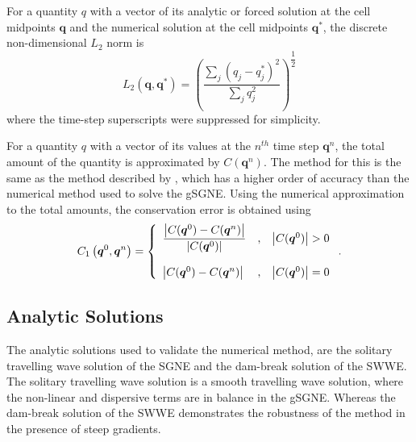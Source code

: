 \documentclass[10pt]{elsarticle}
\newcommand{\vecn}[1]{\boldsymbol{#1}}
\begin{document}
For a quantity $q$ with a vector of its analytic or forced solution at the cell midpoints $\vecn{q}$ and the numerical solution at the cell midpoints $\vecn{q}^*$, the discrete non-dimensional $L_2$ norm is
\begin{equation}
\label{eqn:Conv_Error}
L_2\left(\vecn{q},\vecn{q}^*\right) = \left( \dfrac{\displaystyle\sum_{j}^{}  \left(q_j - q^*_j\right)^2}{\displaystyle\sum_{j}^{}  q_j^2 } \right)^{\dfrac{1}{2}}
\end{equation}
where the time-step superscripts were suppressed for simplicity.

For a quantity $q$ with a vector of its values at the $n^{th}$ time step $\vecn{q}^n$, the total amount of the quantity is approximated by $C(\vecn{q}^n)$. The method for this is the same as the method described by \citet{Zoppou-etal-2017}, which has a higher order of accuracy than the numerical method used to solve the gSGNE. Using the numerical approximation to the total amounts, the conservation error is obtained using
\begin{equation}
\label{eqn:Cons_Error}
C_1\left(\vecn{q}^0,\vecn{q}^n\right) = \left \lbrace \begin{array}{l c r}
\dfrac{\left | C(\vecn{q}^0) - C(\vecn{q}^n) \right |}{\left| C(\vecn{q}^0) \right|} &,& \left| C(\vecn{q}^0) \right| > 0 \\ \\
\left | C(\vecn{q}^0) - C(\vecn{q}^n) \right |&,& \left| C(\vecn{q}^0) \right| = 0 
\end{array} \right. .
\end{equation}


\subsection{Analytic Solutions}
\label{sec:AnaSol}
The analytic solutions used to validate the numerical method, are the solitary travelling wave solution of the SGNE and the dam-break solution of the SWWE. The solitary travelling wave solution is a smooth travelling wave solution, where the non-linear and dispersive terms are in balance in the gSGNE. Whereas the dam-break solution of the SWWE demonstrates the robustness of the method in the presence of steep gradients. 
\end{document}

